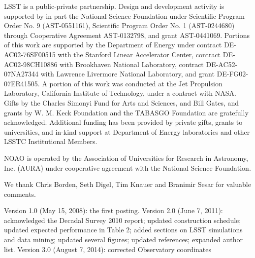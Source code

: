 \documentclass{emulateapj}
\begin{document}
LSST is a public-private partnership.  Design and development activity is
supported by in part the National Science Foundation under Scientific
Program Order No. 9 (AST-0551161), Scientific Program Order No. 1
(AST-0244680) through Cooperative Agreement AST-0132798, and grant AST-0441069. 
Portions of this work are supported by the Department of Energy under contract
DE-AC02-76SF00515 with the Stanford Linear Accelerator Center, contract
DE-AC02-98CH10886 with Brookhaven National Laboratory, contract
DE-AC52-07NA27344 with Lawrence Livermore National Laboratory, and grant
DE-FG02-07ER41505. A portion of this work was conducted at the Jet Propulsion 
Laboratory, California Institute of Technology, under a contract with NASA.
Gifts by the Charles Simonyi Fund for Arts and Sciences,
and Bill Gates, and grants by W. M. Keck Foundation and the TABASGO Foundation
are gratefully acknowledged. Additional funding has been provided by private gifts, grants 
to universities, and in-kind support at Department of Energy laboratories and other 
LSSTC Institutional Members.  

NOAO is operated by the Association of Universities for Research in Astronomy,
Inc. (AURA) under cooperative agreement with the National Science Foundation.

We thank Chris Borden, Seth Digel, Tim Knauer and Branimir Sesar for valuable 
comments.



\vskip 0.06in
Version 1.0 (May 15, 2008): the first posting. 
\vskip 0.06in
Version 2.0 (June 7, 2011): acknowledged the Decadal Survey 2010 report; updated construction schedule;
updated expected performance in Table 2; added sections on LSST simulations and data mining;
updated several figures; updated references; expanded author list. 
\vskip 0.06in
Version 3.0 (August 7, 2014): corrected Observatory coordinates 
\end{document}
